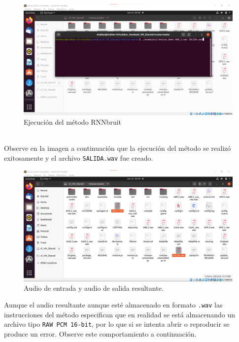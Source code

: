 \documentclass[conference,onecolumn]{IEEEtran}
\begin{document}
 \begin{figure}[H]
 \centering
    \includegraphics[scale=0.45]{VM4.png}
    \caption{Ejecución del método RNNbruit} 
\end{figure}
\hfill\\

Observe en la imagen a continuación que la ejecución del método se realizó exitosamente y el archivo \texttt{SALIDA.wav} fue creado.

 \begin{figure}[H]
 \centering
    \includegraphics[scale=0.4]{VM5.png}
    \caption{Audio de entrada y audio de salida resultante.} 
\end{figure}

Aunque el audio resultante aunque esté almacenado en formato \texttt{.wav} las instrucciones del método especifican que en realidad se está almacenando un archivo tipo \texttt{RAW PCM 16-bit}, por lo que si se intenta abrir o reproducir se produce un error. Observe este comportamiento a continuación.
\end{document}
